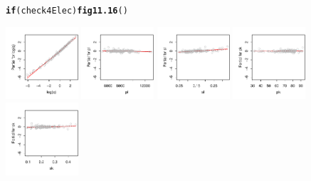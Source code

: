 \documentclass[12pt, a4paper,  BCOR=8.25mm, DIV=15]{scrartcl}\usepackage[]{graphicx}\usepackage[]{color}
\makeatletter
\newcommand{\hlstd}[1]{\textcolor[rgb]{0.345,0.345,0.345}{#1}}%
\newcommand{\hlkwa}[1]{\textcolor[rgb]{0.161,0.373,0.58}{\textbf{#1}}}%
\newcommand{\hlkwd}[1]{\textcolor[rgb]{0.737,0.353,0.396}{\textbf{#1}}}%
\newenvironment{kframe}{%
 \def\at@end@of@kframe{}%
 \ifinner\ifhmode%
  \def\at@end@of@kframe{\end{minipage}}%
  \begin{minipage}{\columnwidth}%
 \fi\fi%
 \def\FrameCommand##1{\hskip\@totalleftmargin \hskip-\fboxsep
 \colorbox{shadecolor}{##1}\hskip-\fboxsep
     \hskip-\linewidth \hskip-\@totalleftmargin \hskip\columnwidth}%
 \MakeFramed {\advance\hsize-\width
   \@totalleftmargin\z@ \linewidth\hsize
   \@setminipage}}%
 {\par\unskip\endMakeFramed%
 \at@end@of@kframe}
\newenvironment{knitrout}{}{} %
\makeatother
\begin{document}
\begin{figure}[H]
\begin{knitrout}
\color{fgcolor}\begin{kframe}
\begin{alltt}
\hlkwa{if}\hlstd{(check4Elec)}\hlkwd{fig11.16}\hlstd{()}
\end{alltt}
\end{kframe}

{\centering \includegraphics[width=0.24\textwidth]{figs/reg-elec-me-tplot-11_16-1} 
\includegraphics[width=0.24\textwidth]{figs/reg-elec-me-tplot-11_16-2} 
\includegraphics[width=0.24\textwidth]{figs/reg-elec-me-tplot-11_16-3} 
\includegraphics[width=0.24\textwidth]{figs/reg-elec-me-tplot-11_16-4} 
\includegraphics[width=0.24\textwidth]{figs/reg-elec-me-tplot-11_16-5} 
}
\end{knitrout}
\end{figure}
\end{document}
